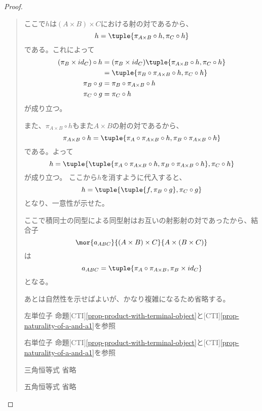 \documentclass[uplatex,dvipdfmx]{jsarticle}
\newcommand{\refcti}[1]{[CTI]\ref{#1}}
\begin{document}
\begin{proof}
\begin{quote}
\begin{mydescription}
        ここで$h$は$(A\times B)\times C$における射の対であるから、\[h=\tuple{\pi_{A\times B}\circ h,\pi_C\circ h}\]である。これによって
        \begin{align*}
          (\pi_B\times id_C)\circ h &= (\pi_B\times id_C) \tuple{\pi_{A\times B}\circ h,\pi_C\circ h}\\
          &=\tuple{\pi_B\circ\pi_{A\times B}\circ h,\pi_C\circ h}\\
          \pi_B\circ g &= \pi_B\circ\pi_{A\times B}\circ h\\
          \pi_C\circ g &= \pi_C\circ h
        \end{align*}
        が成り立つ。

        また、$\pi_{A\times B}\circ h$もまた$A\times B$の射の対であるから、\[\pi_{A\times B}\circ h=\tuple{\pi_A\circ\pi_{A\times B}\circ h,\pi_B\circ\pi_{A\times B}\circ h}\]である。よって\[h = \tuple{\tuple{\pi_A\circ\pi_{A\times B}\circ h,\pi_B\circ\pi_{A\times B}\circ h},\pi_C\circ h}\]が成り立つ。
        ここから$h$を消すように代入すると、\[h = \tuple{\tuple{f,\pi_B\circ g},\pi_C\circ g}\]となり、一意性が示せた。
        
        ここで積同士の同型による同型射はお互いの射影射の対であったから、結合子\[\mor{a_{ABC}}{(A\times B)\times C}{A\times (B\times C)}\]は
        \[a_{ABC}=\tuple{\pi_A\circ\pi_{A\times B},\pi_B\times id_C}\]となる。

        あとは自然性を示せばよいが、かなり複雑になるため省略する。
        \item[左単位子]
        命題\refcti{prop-product-with-terminal-object}と\refcti{prop-naturality-of-a-and-a1}を参照
        \item[右単位子]
        命題\refcti{prop-product-with-terminal-object}と\refcti{prop-naturality-of-a-and-a1}を参照
        \item[三角恒等式]省略
        \item[五角恒等式]省略
      \end{mydescription}
    \end{quote}
  \end{proof}
\end{document}
